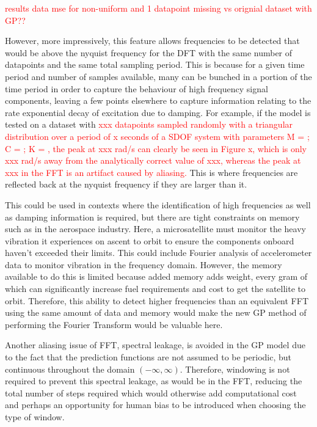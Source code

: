 \documentclass[12pt]{article}
\begin{document}
    \textcolor{red}{results data mse for non-uniform and 1 datapoint missing vs orignial dataset with GP??}

    However, more impressively, this feature allows frequencies to be detected that would be above the nyquist frequency for the DFT with the same number of datapoints and the same total sampling period.
    This is because for a given time period and number of samples available, many can be bunched in a portion of the time period in order to capture the behaviour of high frequency signal components, leaving a few points elsewhere to capture information relating to the rate exponential decay of excitation due to damping.
    For example, if the model is tested on a dataset with \textcolor{red}{xxx datapoints sampled randomly with a triangular distribution over a period of x seconds of a SDOF system with parameters M = ; C = ; K = , the peak at xxx rad/s can clearly be seen in Figure x, which is only xxx rad/s away from the analytically correct value of xxx, whereas the peak at xxx in the FFT is an artifact caused by aliasing.}
    This is where frequencies are reflected back at the nyquist frequency if they are larger than it.

     This could be used in contexts where the identification of high frequencies as well as damping information is required, but there are tight constraints on memory such as in the aerospace industry.
    Here, a microsatellite must monitor the heavy vibration it experiences on ascent to orbit to ensure the components onboard haven't exceeded their limits.
    This could include Fourier analysis of accelerometer data to monitor vibration in the frequency domain.
    However, the memory available to do this is limited because added memory adds weight, every gram of which can significantly increase fuel requirements and cost to get the satellite to orbit.
    Therefore, this ability to detect higher frequencies than an equivalent FFT using the same amount of data and memory would make the new GP method of performing the Fourier Transform would be valuable here.

    Another aliasing issue of FFT, spectral leakage, is avoided in the GP model due to the fact that the prediction functions are not assumed to be periodic, but continuous throughout the domain $(-\infty, \infty)$.
    Therefore, windowing is not required to prevent this spectral leakage, as would be in the FFT, reducing the total number of steps required which would otherwise add computational cost and perhaps an opportunity for human bias to be introduced when choosing the type of window.
\end{document}
